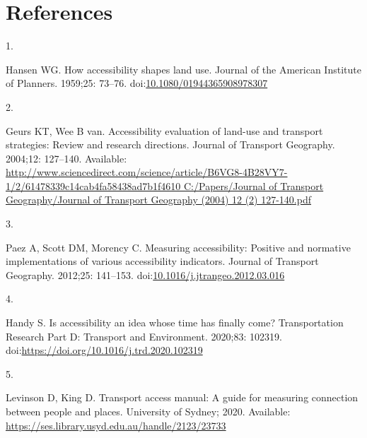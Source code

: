 \documentclass[10pt,letterpaper]{article}
\newlength{\cslhangindent}
\newlength{\csllabelwidth}
\newlength{\cslentryspacingunit} %
\newenvironment{CSLReferences}[2] %
 {%
  \setlength{\parindent}{0pt}
  \ifodd #1
  \let\oldpar\par
  \def\par{\hangindent=\cslhangindent\oldpar}
  \fi
  \setlength{\parskip}{#2\cslentryspacingunit}
 }%
 {}
\newcommand{\CSLLeftMargin}[1]{\parbox[t]{\csllabelwidth}{#1}}
\newcommand{\CSLRightInline}[1]{\parbox[t]{\linewidth - \csllabelwidth}{#1}\break}
\begin{document}
\hypertarget{references}{%
\section*{References}\label{references}}

\hypertarget{refs}{}
\begin{CSLReferences}{0}{0}
\leavevmode{}%
\CSLLeftMargin{1. }%
\CSLRightInline{Hansen WG. How accessibility shapes land use. Journal of
the American Institute of Planners. 1959;25: 73--76.
doi:\href{https://doi.org/10.1080/01944365908978307}{10.1080/01944365908978307}}

\leavevmode{}%
\CSLLeftMargin{2. }%
\CSLRightInline{Geurs KT, Wee B van. Accessibility evaluation of
land-use and transport strategies: Review and research directions.
Journal of Transport Geography. 2004;12: 127--140. Available:
\href{http://www.sciencedirect.com/science/article/B6VG8-4B28VY7-1/2/61478339c14cab4fa58438ad7b1f4610\%0AC:/Papers/Journal\%20of\%20Transport\%20Geography/Journal\%20of\%20Transport\%20Geography\%20(2004)\%2012\%20(2)\%20127-140.pdf}{http://www.sciencedirect.com/science/article/B6VG8-4B28VY7-1/2/61478339c14cab4fa58438ad7b1f4610
C:/Papers/Journal of Transport Geography/Journal of Transport Geography
(2004) 12 (2) 127-140.pdf}}

\leavevmode{}%
\CSLLeftMargin{3. }%
\CSLRightInline{Paez A, Scott DM, Morency C. Measuring accessibility:
Positive and normative implementations of various accessibility
indicators. Journal of Transport Geography. 2012;25: 141--153.
doi:\href{https://doi.org/10.1016/j.jtrangeo.2012.03.016}{10.1016/j.jtrangeo.2012.03.016}}

\leavevmode{}%
\CSLLeftMargin{4. }%
\CSLRightInline{Handy S. Is accessibility an idea whose time has finally
come? Transportation Research Part D: Transport and Environment.
2020;83: 102319. doi:\url{https://doi.org/10.1016/j.trd.2020.102319}}

\leavevmode{}%
\CSLLeftMargin{5. }%
\CSLRightInline{Levinson D, King D. Transport access manual: {A} guide
for measuring connection between people and places. {University of
Sydney}; 2020. Available:
\url{https://ses.library.usyd.edu.au/handle/2123/23733}}


\end{CSLReferences}
\end{document}
